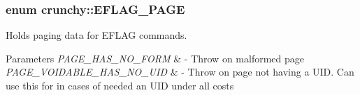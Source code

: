 \subsubsection[{E\+F\+L\+A\+G\+\_\+\+P\+A\+GE}]{\setlength{\rightskip}{0pt plus 5cm}enum {\bf crunchy\+::\+E\+F\+L\+A\+G\+\_\+\+P\+A\+GE}}\hypertarget{namespacecrunchy_ad63d9cf0dc471a6e9379c12cd89fb5a9}{}\label{namespacecrunchy_ad63d9cf0dc471a6e9379c12cd89fb5a9}


Holds paging data for E\+F\+L\+AG commands. 


\begin{DoxyParams}{Parameters}
{\em P\+A\+G\+E\+\_\+\+H\+A\+S\+\_\+\+N\+O\+\_\+\+F\+O\+RM} & -\/ Throw on malformed page \\
\hline
{\em P\+A\+G\+E\+\_\+\+V\+O\+I\+D\+A\+B\+L\+E\+\_\+\+H\+A\+S\+\_\+\+N\+O\+\_\+\+U\+ID} & -\/ Throw on page not having a U\+ID. Can use this for in cases of needed an U\+ID under all costs \\
\hline
\end{DoxyParams}

